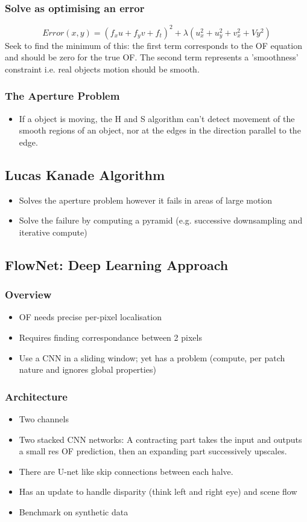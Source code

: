 \documentclass[]{article}
\begin{document}
		\subsubsection{Solve as optimising an error}
			$$ Error(x,y) = (f_x u + f_y v + f_t)^2 + \lambda (u_x^2 + u_y^2 + v_x^2 + Vy^2) $$
		\textnormal{Seek to find the minimum of this: the first term corresponds to the OF equation and should be zero for the true OF. The second term represents a 'smoothness' constraint i.e. real objects motion should be smooth.}
		\subsubsection{The Aperture Problem}
		\begin{itemize}
			\item If a object is moving, the H and S algorithm can't detect movement of the smooth regions of an object, nor at the edges in the direction parallel to the edge.
		\end{itemize}
	\subsection{Lucas Kanade Algorithm}
		\begin{itemize}
			\item Solves the aperture problem however it fails in areas of large motion
			\item Solve the failure by computing a pyramid (e.g. successive downsampling and iterative compute)
		\end{itemize}
	\subsection{FlowNet: Deep Learning Approach}
		\subsubsection{Overview}
		\begin{itemize}
			\item OF needs precise per-pixel localisation
			\item Requires finding correspondance between 2 pixels
			\item Use a CNN in a sliding window; yet has a problem (compute, per patch nature and ignores global properties) 
		\end{itemize}
		\subsubsection{Architecture}
		\begin{itemize}
			\item Two channels
			\item Two stacked CNN networks: A contracting part takes the input and outputs a small res OF prediction, then an expanding part successively upscales.
			\item There are U-net like skip connections between each halve.
			\item Has an update to handle disparity (think left and right eye) and scene flow
			\item Benchmark on synthetic data
		\end{itemize}
\end{document}
